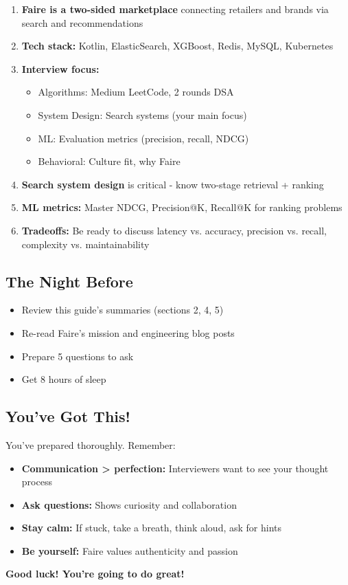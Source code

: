 \documentclass[11pt,letterpaper]{article}
\begin{document}
\begin{enumerate}
    \item \textbf{Faire is a two-sided marketplace} connecting retailers and brands via search and recommendations

    \item \textbf{Tech stack:} Kotlin, ElasticSearch, XGBoost, Redis, MySQL, Kubernetes

    \item \textbf{Interview focus:}
    \begin{itemize}
        \item Algorithms: Medium LeetCode, 2 rounds DSA
        \item System Design: Search systems (your main focus)
        \item ML: Evaluation metrics (precision, recall, NDCG)
        \item Behavioral: Culture fit, why Faire
    \end{itemize}

    \item \textbf{Search system design} is critical - know two-stage retrieval + ranking

    \item \textbf{ML metrics:} Master NDCG, Precision@K, Recall@K for ranking problems

    \item \textbf{Tradeoffs:} Be ready to discuss latency vs. accuracy, precision vs. recall, complexity vs. maintainability
\end{enumerate}

\subsection{The Night Before}

\begin{itemize}
    \item Review this guide's summaries (sections 2, 4, 5)
    \item Re-read Faire's mission and engineering blog posts
    \item Prepare 5 questions to ask
    \item Get 8 hours of sleep
\end{itemize}

\subsection{You've Got This!}

You've prepared thoroughly. Remember:
\begin{itemize}
    \item \textbf{Communication > perfection:} Interviewers want to see your thought process
    \item \textbf{Ask questions:} Shows curiosity and collaboration
    \item \textbf{Stay calm:} If stuck, take a breath, think aloud, ask for hints
    \item \textbf{Be yourself:} Faire values authenticity and passion
\end{itemize}

\textbf{Good luck! You're going to do great! 🚀}
\end{document}
